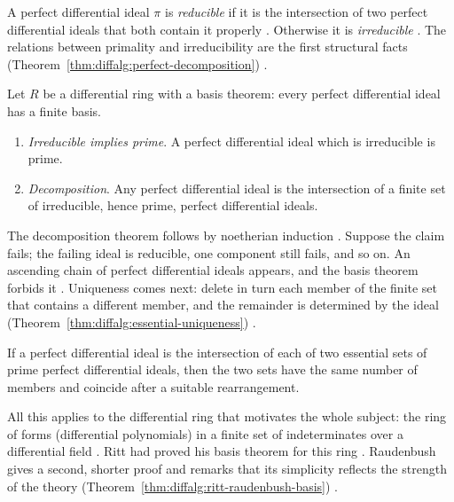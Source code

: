 A perfect differential ideal $\pi$ is \emph{reducible} if it is the
intersection of two perfect differential ideals that both contain it
properly \cite[p.~365]{Raudenbush1934}. Otherwise it is
\emph{irreducible} \cite[p.~365]{Raudenbush1934}. The relations between
primality and irreducibility are the first structural facts (Theorem~\ref{thm:diffalg:perfect-decomposition})
\cite[p.~365]{Raudenbush1934}.\begin{theorem}\label{thm:diffalg:perfect-decomposition}
Let $R$ be a differential ring with a basis theorem: every perfect
differential ideal has a finite basis.

\begin{enumerate}
\item \emph{Irreducible implies prime}. A perfect differential ideal
  which is irreducible is prime.
\item \emph{Decomposition}. Any perfect differential ideal is the
  intersection of a finite set of irreducible, hence prime, perfect
  differential ideals.
\end{enumerate}
\end{theorem}

The decomposition theorem follows by noetherian induction
\cite[p.~365]{Raudenbush1934}. Suppose the claim fails; the failing
ideal is reducible, one component still fails, and so on. An ascending
chain of perfect differential ideals appears, and the basis theorem
forbids it \cite[p.~365]{Raudenbush1934}. Uniqueness comes next: delete
in turn each member of the finite set that contains a different member,
and the remainder is determined by the ideal (Theorem~\ref{thm:diffalg:essential-uniqueness})
\cite[pp.~365--366]{Raudenbush1934}.\begin{theorem}\label{thm:diffalg:essential-uniqueness}
If a perfect differential ideal is the intersection of each of two
essential sets of prime perfect differential ideals, then the two sets
have the same number of members and coincide after a suitable
rearrangement.
\end{theorem}

All this applies to the differential ring that motivates the
whole subject: the ring of forms (differential polynomials) in a finite
set of indeterminates over a differential field
\cite[p.~361]{Raudenbush1934}. Ritt had proved his basis theorem for
this ring \cite[p.~361]{Raudenbush1934}. Raudenbush gives a second,
shorter proof and remarks that its simplicity reflects the strength of
the theory (Theorem~\ref{thm:diffalg:ritt-raudenbush-basis}) \cite[p.~362]{Raudenbush1934}.

